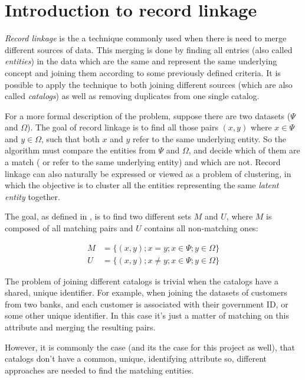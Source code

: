 \documentclass[epsfig,a4paper,11pt,titlepage,twoside,openany]{book}
\begin{document}
\section{Introduction to record linkage}
\label{sec:rl-intro}

\textit{Record linkage} is the a technique commonly used when there is need to merge different sources of data. This merging is done by finding all entries (also called \textit{entities}) in the data which are the same and represent the same underlying concept and joining them according to some previously defined criteria. It is possible to apply the technique to both joining different sources (which are also called \textit{catalogs}) as well as removing duplicates from one single catalog.

  

For a more formal description of the problem, suppose there are two datasets ($\Psi$ and $\Omega$). The goal of record linkage is to find all those pairs $(x, y)$ where $x \in \Psi$ and $y \in \Omega$, such that both $x$ and $y$ refer to the same underlying entity. So the algorithm must compare the entities from $\Psi$ and $\Omega$, and decide which of them are a match ( or refer to the same underlying entity) and which are not. 
Record linkage can also naturally be expressed or viewed as a problem of clustering, in which the objective is to cluster all the entities representing the same \textit{latent entity} together.

The goal, as defined in \cite{fellegi69_theor_recor_linkag}, is to find two different sets $M$ and $U$, where $M$ is composed of all matching pairs and $U$ contains all non-matching ones:

\begin{align*}
  M &= \{(x, y); x = y; x \in \Psi; y \in \Omega\} \\
  U &= \{(x, y); x \neq y; x \in \Psi; y \in \Omega\}
\end{align*}

The problem of joining different catalogs is trivial when the catalogs have a
shared, unique identifier. For example, when joining the datasets of
customers from two banks, and each customer is associated with their government
ID, or some other unique identifier. In this case it's just a matter of
matching on this attribute and merging the resulting pairs.

However, it is commonly the case (and its the case for this project as well), that
catalogs don't have a common, unique, identifying attribute so, different approaches are needed to find the matching entities. 
\end{document}

